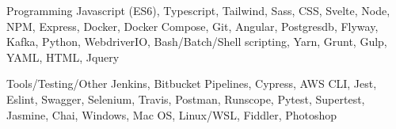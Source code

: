 

\begin{cvskills}

  \cvskill
    {Programming} %
    {Javascript (ES6), Typescript, Tailwind, Sass, CSS, Svelte, Node, NPM, Express, Docker, Docker Compose, Git, Angular, Postgresdb, Flyway, Kafka, Python, WebdriverIO, Bash/Batch/Shell scripting, Yarn, Grunt, Gulp, YAML, HTML, Jquery} %

  \cvskill
    {Tools/Testing/Other} %
    {Jenkins, Bitbucket Pipelines, Cypress, AWS CLI, Jest, Eslint, Swagger, Selenium, Travis, Postman, Runscope, Pytest, Supertest, Jasmine, Chai, Windows, Mac OS, Linux/WSL, Fiddler, Photoshop} %

\end{cvskills}
